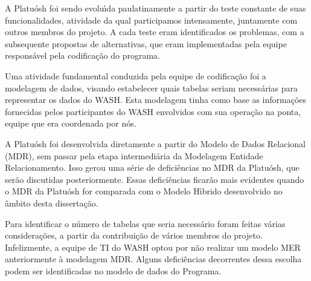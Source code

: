 \documentclass[
12pt,		%
openright,	%
twoside,  %
a4paper,			%
chapter=TITLE,		%
english,			%
french,				%
spanish,			%
brazil				%
]{USPSC-classe/USPSC}
\begin{document}
A Platu\'osh foi sendo evolu\'{\i}da paulatinamente a partir do teste constante de suas funcionalidades, atividade da qual participamos intensamente, juntamente com outros membros do projeto. A cada teste eram identificados os problemas, com a subsequente propostas de alternativas, que eram implementadas pela equipe respons\'avel pela codifica\c{c}\~ao do programa.

















Uma atividade fundamental conduzida pela equipe de codifica\c{c}\~ao foi a modelagem de dados, visando estabelecer quais tabelas seriam necess\'arias para representar os dados do WASH. Esta modelagem tinha como base as informa\c{c}\~oes fornecidas pelos participantes do WASH envolvidos com sua opera\c{c}\~ao na ponta, equipe que era coordenada por n\'os.

















A Platu\'osh foi desenvolvida diretamente a partir do Modelo de Dados Relacional (MDR), sem passar pela etapa intermedi\'aria da Modelagem Entidade Relacionamento. Isso gerou uma s\'erie de defici\^encias no MDR da Platu\'osh, que ser\~ao discutidas posteriormente. Essas defici\^encias ficar\~ao mais evidentes quando o MDR da Platu\'osh for comparada com o Modelo H\'{\i}brido desenvolvido no \^ambito desta disserta\c{c}\~ao.

















Para identificar o n\'umero de tabelas que seria necess\'ario foram feitas v\'arias considera\c{c}\~oes, a partir da contribui\c{c}\~ao de v\'arios membros do projeto. Infelizmente, a equipe de TI do WASH optou por n\~ao realizar um modelo MER anteriormente \`a modelagem MDR. Alguns defici\^encias decorrentes dessa escolha podem ser identificadas no modelo de dados do Programa.
\end{document}
